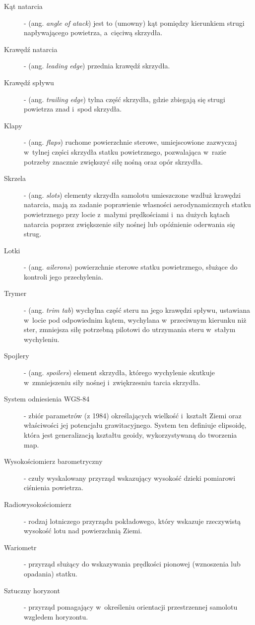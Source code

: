 \documentclass{mwrep}
\begin{document}
\begin{description}
\item[Kąt natarcia] - (ang. \emph{angle of atack}) jest to (umowny) kąt pomiędzy kierunkiem strugi napływającego powietrza, a~cięciwą skrzydła.
\item[Krawędź natarcia] - (ang. \emph{leading edge}) przednia krawędź skrzydła.
\item[Krawędź spływu] - (ang. \emph{trailing edge}) tylna część skrzydła, gdzie zbiegają się strugi powietrza znad i~spod skrzydła.
\item[Klapy] - (ang. \emph{flaps}) ruchome powierzchnie sterowe, umiejscowione zazwyczaj w~tylnej części skrzydła statku powietrznego, pozwalająca w~razie potrzeby znacznie zwiększyć siłę nośną oraz opór skrzydła.
\item[Skrzela] - (ang. \emph{slots}) elementy skrzydła samolotu umieszczone wzdłuż krawędzi natarcia, mają za zadanie poprawienie własności aerodynamicznych statku powietrznego przy locie z~małymi prędkościami i~na dużych kątach natarcia poprzez zwiększenie siły nośnej lub opóźnienie oderwania się strug.
\item[Lotki] - (ang. \emph{ailerons}) powierzchnie sterowe statku powietrznego, służące do kontroli jego przechylenia.
\item[Trymer] - (ang. \emph{trim tab}) wychylna część steru na jego krawędzi spływu, ustawiana w~locie pod odpowiednim kątem, wychylana w~przeciwnym kierunku niż ster, zmniejsza siłę potrzebną pilotowi do utrzymania steru w~stałym wychyleniu.
\item[Spojlery] - (ang. \emph{spoilers}) element skrzydła, którego wychylenie skutkuje w~zmniejszeniu siły nośnej i~zwiękrzesniu tarcia skrzydła.
\item[System odniesienia WGS-84] - zbiór parametrów (z 1984) określających wielkość i~kształt Ziemi oraz właściwości jej potencjału grawitacyjnego. System ten definiuje elipsoidę, która jest generalizacją kształtu geoidy, wykorzystywaną do tworzenia map.
\item[Wysokościomierz barometryczny] - czuły wyskalowany przyrząd wskazujący wysokość dzieki pomiarowi ciśnienia powietrza.
\item[Radiowysokościomierz] - rodzaj lotniczego przyrządu pokładowego, który wskazuje rzeczywistą wysokość lotu nad powierzchnią Ziemi.
\item[Wariometr] - przyrząd służący do wskazywania prędkości pionowej (wznoszenia lub opadania) statku.
\item[Sztuczny horyzont] - przyrząd pomagający w~określeniu orientacji przestrzennej samolotu wzgledem horyzontu.

\end{description}
\end{document}

